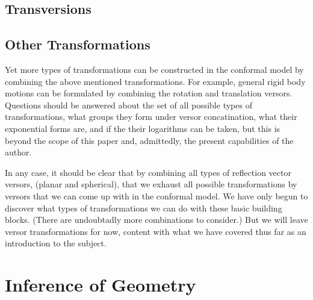 \documentclass[12pt]{article}
\begin{document}

\subsection{Transversions}




\subsection{Other Transformations}

Yet more types of transformations can be constructed in the conformal model
by combining the above mentioned transformations.  For example, general
rigid body motions can be formulated by combining the rotation and translation
versors.  Questions should be answered about the set of all possible types
of transformations, what groups they form under versor concatination, what
their exponential forms are, and if the their logarithms can be taken, but
this is beyond the scope of this paper and, admittedly, the present capabilities of the author.

In any case, it should be clear that by combining all types of reflection vector versors, (planar and spherical),
that we exhaust all possible transformations by versors that we can come up with in the
conformal model.  We have only begun to discover what types of transformations we
can do with these basic building blocks.  (There are undoubtadly more combinations to
consider.)  But we will leave versor transformations for now, content with what we have
covered thus far as an introduction to the subject.

\section{Inference of Geometry}
\end{document}
